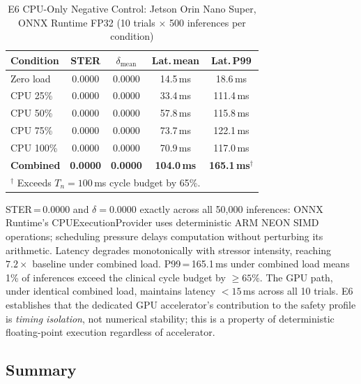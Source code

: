 \documentclass[journal,10pt,twocolumn]{IEEEtran}
\begin{document}
\begin{table}[!t]
\caption{E6 CPU-Only Negative Control: Jetson Orin Nano Super,
  ONNX Runtime FP32 (10 trials $\times$ 500 inferences per condition)}
\label{tab:e6}
\centering
\small
\begin{tabular}{lcccc}
\toprule
\textbf{Condition} & \textbf{STER} & \boldmath$\delta_\text{mean}$ & \textbf{Lat.\,mean} & \textbf{Lat.\,P99} \\
\midrule
Zero load    & 0.0000 & 0.0000 & 14.5\,ms & 18.6\,ms \\
CPU 25\%     & 0.0000 & 0.0000 & 33.4\,ms & 111.4\,ms \\
CPU 50\%     & 0.0000 & 0.0000 & 57.8\,ms & 115.8\,ms \\
CPU 75\%     & 0.0000 & 0.0000 & 73.7\,ms & 122.1\,ms \\
CPU 100\%    & 0.0000 & 0.0000 & 70.9\,ms & 117.0\,ms \\
\textbf{Combined} & \textbf{0.0000} & \textbf{0.0000} & \textbf{104.0\,ms} & \textbf{165.1\,ms}$^\dagger$ \\
\bottomrule
\multicolumn{5}{l}{$^\dagger$ Exceeds $T_n{=}100$\,ms cycle budget by 65\%.}
\end{tabular}
\end{table}

STER\,=\,0.0000 and $\delta{=}0.0000$ exactly across all 50,000
inferences: ONNX Runtime's CPUExecutionProvider uses deterministic
ARM NEON SIMD operations; scheduling pressure delays computation
without perturbing its arithmetic.
Latency degrades monotonically with stressor intensity, reaching
$7.2{\times}$ baseline under combined load.
P99\,=\,165.1\,ms under combined load means 1\% of inferences
exceed the clinical cycle budget by ${\geq}65\%$.
The GPU path, under identical combined load, maintains latency
${<}15$\,ms across all 10 trials.
E6 establishes that the dedicated GPU accelerator's contribution to
the safety profile is \emph{timing isolation}, not numerical stability; this is a property of deterministic floating-point execution regardless of accelerator.

\subsection{Summary}
\end{document}

